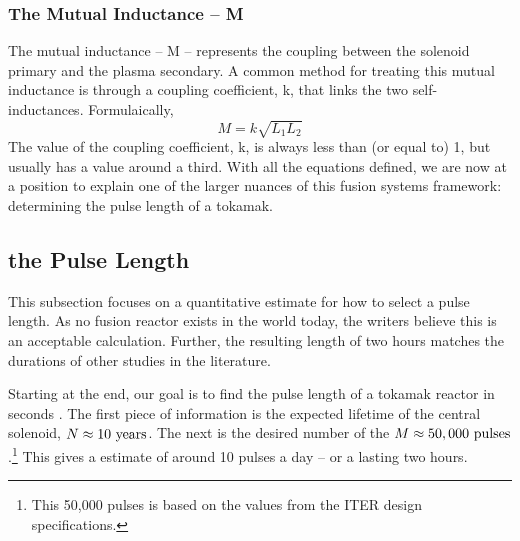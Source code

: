 \subsubsection{The Mutual Inductance -- M}

The mutual inductance -- M -- represents the coupling between the solenoid primary and the plasma secondary. A common method for treating this mutual inductance is through a coupling coefficient, k, that links the two self-inductances. Formulaically,
\begin{equation}
	M = k \sqrt{ L_1 L_2 }
\end{equation}
The value of the coupling coefficient, k, is always less than (or equal to) 1, but usually has a value around a third. With all the equations defined, we are now at a position to explain one of the larger nuances of this fusion systems framework: determining the pulse length of a tokamak.

\subsection{ the Pulse Length}

\label{section:pulse}

This subsection focuses on a quantitative estimate for how to select a pulse length. As no fusion reactor exists in the world today, the writers believe this is an acceptable calculation. Further, the resulting length of two hours matches the durations of other studies in the literature.\cite{process,iter_cs}

Starting at the end, our goal is to find the pulse length of a tokamak reactor in seconds .  The first piece of information is the expected lifetime of the central solenoid, $ N \approx 10 \ \textnormal{years} $. The next is the desired number of  the  $ M \approx 50,000 \ \textnormal{pulses} $.\footnote{This 50,000 pulses is based on the values from the ITER design specifications.\cite{iter_cs} } This gives a  estimate of around 10 pulses a day -- or a  lasting two hours.

